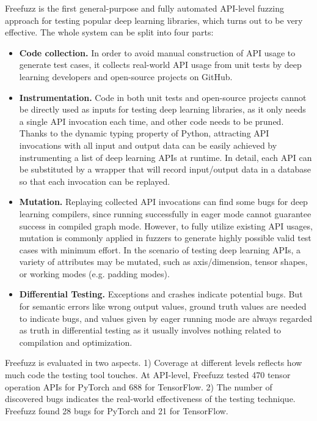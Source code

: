 \begin{survey}
Freefuzz\cite{freefuzz} is the first general-purpose and fully automated API-level fuzzing approach for testing popular deep learning libraries, which turns out to be very effective. The whole system can be split into four parts:

\begin{itemize}
    \item \textbf{Code collection.} In order to avoid manual construction of API usage to generate test cases, it collects real-world API usage from unit tests by deep learning developers and open-source projects on GitHub.
    \item \textbf{Instrumentation.} Code in both unit tests and open-source projects cannot be directly used as inputs for testing deep learning libraries, as it only needs a single API invocation each time, and other code needs to be pruned. Thanks to the dynamic typing property of Python, attracting API invocations with all input and output data can be easily achieved by instrumenting a list of deep learning APIs at runtime. In detail, each API can be substituted by a wrapper that will record input/output data in a database so that each invocation can be replayed.
    \item \textbf{Mutation.} Replaying collected API invocations can find some bugs for deep learning compilers, since running successfully in eager mode cannot guarantee success in compiled graph mode. However, to fully utilize existing API usages, mutation is commonly applied in fuzzers to generate highly possible valid test cases with minimum effort. In the scenario of testing deep learning APIs, a variety of attributes may be mutated, such as axis/dimension, tensor shapes, or working modes (e.g. padding modes).
    \item \textbf{Differential Testing.} Exceptions and crashes indicate potential bugs. But for semantic errors like wrong output values, ground truth values are needed to indicate bugs, and values given by eager running mode are always regarded as truth in differential testing as it usually involves nothing related to compilation and optimization.
\end{itemize}

Freefuzz is evaluated in two aspects. 1) Coverage at different levels reflects how much code the testing tool touches. At API-level, Freefuzz tested 470 tensor operation APIs for PyTorch and 688 for TensorFlow. 2) The number of discovered bugs indicates the real-world effectiveness of the testing technique. Freefuzz found 28 bugs for PyTorch and 21 for TensorFlow.


\end{survey}
